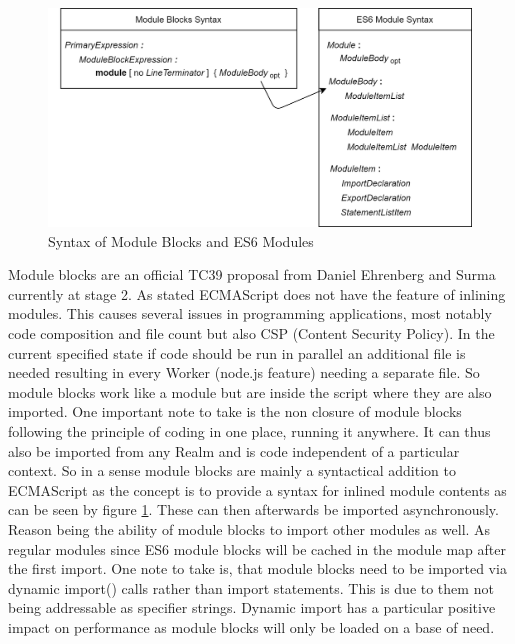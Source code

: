 \begin{figure}[h!]
    \includegraphics[scale=0.165]{figures/ModuleSyntax.png}
    \caption{Syntax of Module Blocks and ES6 Modules}
    \label{fig:mbSyn}
\end{figure}

Module blocks are an official TC39 proposal from Daniel Ehrenberg and Surma currently at stage 2. \cite{gitMB} As stated ECMAScript does not have the feature of inlining modules. This causes several issues in programming applications, most notably code composition and file count but also CSP (Content Security Policy). In the current specified state if code should be run in parallel an additional file is needed resulting in every Worker (node.js feature) needing a separate file. So module blocks work like a module but are inside the script where they are also imported. One important note to take is the non closure of module blocks following the principle of coding in one place, running it anywhere. It can thus also be imported from any Realm and is code independent of a particular context. So in a sense module blocks are mainly a syntactical addition to ECMAScript as the concept is to provide a syntax for inlined module contents as can be seen by figure \ref{fig:mbSyn}. \cite{gitMB, ecma} These can then afterwards be imported asynchronously. Reason being the ability of module blocks to import other modules as well. As regular modules since ES6 module blocks will be cached in the module map after the first import. One note to take is, that module blocks need to be imported via dynamic import() calls rather than import statements. This is due to them not being addressable as specifier strings. Dynamic import  has a particular positive impact on performance as module blocks will only be loaded on a base of need.



